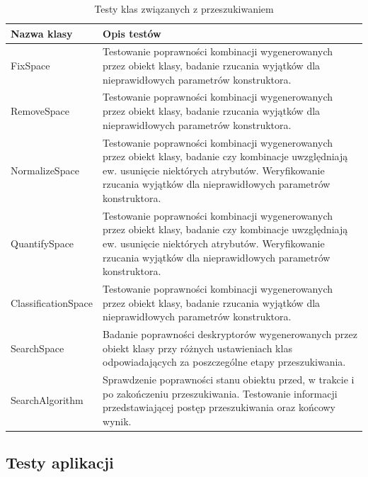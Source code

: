 \documentclass[../thesis.tex]{subfiles}
\begin{document}
\begin{table}[h]
\centering
\begin{tabular}{ p{40mm} | p{110mm} }
Nazwa klasy & Opis testów \\
\hline
FixSpace & Testowanie poprawności kombinacji wygenerowanych przez obiekt klasy, badanie rzucania wyjątków dla nieprawidłowych parametrów konstruktora. \\
RemoveSpace & Testowanie poprawności kombinacji wygenerowanych przez obiekt klasy, badanie rzucania wyjątków dla nieprawidłowych parametrów konstruktora. \\
NormalizeSpace & Testowanie poprawności kombinacji wygenerowanych przez obiekt klasy, badanie czy kombinacje uwzględniają ew. usunięcie niektórych atrybutów. Weryfikowanie rzucania wyjątków dla nieprawidłowych parametrów konstruktora. \\
QuantifySpace & Testowanie poprawności kombinacji wygenerowanych przez obiekt klasy, badanie czy kombinacje uwzględniają ew. usunięcie niektórych atrybutów. Weryfikowanie rzucania wyjątków dla nieprawidłowych parametrów konstruktora. \\
Classification\-Space & Testowanie poprawności kombinacji wygenerowanych przez obiekt klasy, badanie rzucania wyjątków dla nieprawidłowych parametrów konstruktora. \\
SearchSpace & Badanie poprawności deskryptorów wygenerowanych przez obiekt klasy przy różnych ustawieniach klas odpowiadających za poszczególne etapy przeszukiwania. \\
SearchAlgorithm & Sprawdzenie poprawności stanu obiektu przed, w trakcie i po zakończeniu przeszukiwania. Testowanie informacji przedstawiającej postęp przeszukiwania oraz końcowy wynik. \\
\end{tabular}
\caption{Testy klas związanych z przeszukiwaniem}
\label{proj:lib_search_uts}
\end{table}

\subsection{Testy aplikacji}
\end{document}
